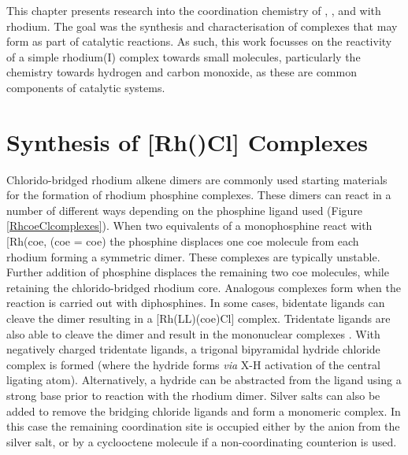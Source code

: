 This chapter presents research into the coordination chemistry of \tBusixantphos, \tButhixantphos, and \tBuxantphos{} with rhodium.  The goal was the synthesis and characterisation of complexes that may form as part of catalytic reactions.  As such, this work focusses on the reactivity of a simple rhodium(I) complex towards small molecules, particularly the chemistry towards hydrogen and carbon monoxide, as these are common components of catalytic systems.  

\section{Synthesis of [Rh(\POP)Cl] Complexes}
\label{section:rhodiumchloride}

Chlorido-bridged rhodium alkene dimers are commonly used starting materials for the formation of rhodium phosphine complexes.  These dimers can react in a number of different ways depending on the phosphine ligand used (Figure \ref{RhcoeClcomplexes}).  When two equivalents of a monophosphine react with [Rh(\acrshort{coe}\ce{)2Cl]2}, (\acrshort{coe} = \acrlong{coe}) the phosphine displaces one \acrshort{coe} molecule from each rhodium forming a symmetric dimer.\cite{Canepa2003}  These complexes are typically unstable.  Further addition of phosphine displaces the remaining two \acrshort{coe} molecules, while retaining the chlorido-bridged rhodium core.\cite{Bleeke1986}  Analogous complexes form when the reaction is carried out with diphosphines.\cite{Fryzuk1989}  In some cases, bidentate ligands can cleave the dimer resulting in a [Rh(LL)(\acrshort{coe})Cl] complex.\cite{Hashimoto2010}  Tridentate ligands are also able to cleave the dimer and result in the mononuclear complexes \ce{[Rh(LLL)Cl]}\cite{Khan1988, Hermann2002}.  With negatively charged tridentate ligands, a trigonal bipyramidal hydride chloride complex is formed (where the hydride forms \emph{via} X-H activation of the central ligating atom).\cite{Boom1998, Winter2003, Salem2008}  Alternatively, a hydride can be abstracted from the ligand using a strong base prior to reaction with the rhodium dimer.  Silver salts can also be added to remove the bridging chloride ligands and form a monomeric complex.  In this case the remaining coordination site is occupied either by the anion from the silver salt, or by a cyclooctene molecule if a non-coordinating counterion is used.\cite{Fryzuk1986, Hanson2008}

